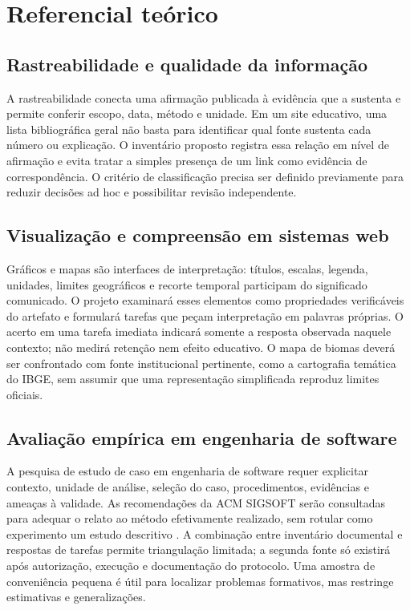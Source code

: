 \documentclass[12pt,oneside,a4paper,brazil]{abntex2}
\begin{document}
\chapter{Referencial teórico}
\section{Rastreabilidade e qualidade da informação}
A rastreabilidade conecta uma afirmação publicada à evidência que a sustenta e permite conferir escopo, data, método e unidade. Em um site educativo, uma lista bibliográfica geral não basta para identificar qual fonte sustenta cada número ou explicação. O inventário proposto registra essa relação em nível de afirmação e evita tratar a simples presença de um link como evidência de correspondência. O critério de classificação precisa ser definido previamente para reduzir decisões ad hoc e possibilitar revisão independente.

\section{Visualização e compreensão em sistemas web}
Gráficos e mapas são interfaces de interpretação: títulos, escalas, legenda, unidades, limites geográficos e recorte temporal participam do significado comunicado. O projeto examinará esses elementos como propriedades verificáveis do artefato e formulará tarefas que peçam interpretação em palavras próprias. O acerto em uma tarefa imediata indicará somente a resposta observada naquele contexto; não medirá retenção nem efeito educativo. O mapa de biomas deverá ser confrontado com fonte institucional pertinente, como a cartografia temática do IBGE, sem assumir que uma representação simplificada reproduz limites oficiais.

\section{Avaliação empírica em engenharia de software}
A pesquisa de estudo de caso em engenharia de software requer explicitar contexto, unidade de análise, seleção do caso, procedimentos, evidências e ameaças à validade. As recomendações da ACM SIGSOFT serão consultadas para adequar o relato ao método efetivamente realizado, sem rotular como experimento um estudo descritivo \cite{sigsoft}. A combinação entre inventário documental e respostas de tarefas permite triangulação limitada; a segunda fonte só existirá após autorização, execução e documentação do protocolo. Uma amostra de conveniência pequena é útil para localizar problemas formativos, mas restringe estimativas e generalizações.
\end{document}
